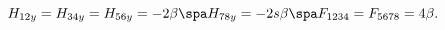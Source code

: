 \begin{equation}
\label{fluxn4iia1}
H_{12y} = H_{34y} = H_{56y} = - 2\beta
\spa
H_{78y} = - 2 s \beta 
\spa
F_{1234} = F_{5678} = 4 \beta.
\end{equation}


